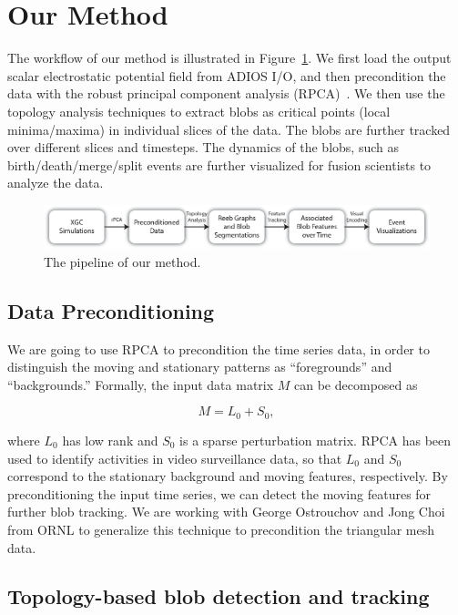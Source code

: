 \section{Our Method}
\label{sec:method}

The workflow of our method is illustrated in Figure~\ref{fig:pipeline}.  
We first load the output scalar electrostatic potential field from ADIOS I/O, and then precondition the data with the robust principal component analysis (RPCA)~\cite{CandesLMW11}.  We then use the topology analysis techniques to extract blobs as critical points (local minima/maxima) in individual slices of the data.  The blobs are further tracked over different slices and timesteps.  The dynamics of the blobs, such as birth/death/merge/split events are further visualized for fusion scientists to analyze the data.  

\begin{figure}[!h]
  \centering
  \includegraphics[width=\linewidth]{Figs/pipeline}
  \caption{The pipeline of our method.}
  \label{fig:pipeline}
\end{figure}


\subsection{Data Preconditioning}
We are going to use RPCA to precondition the time series data, in order to distinguish the moving and stationary patterns as ``foregrounds'' and ``backgrounds.''  Formally, the input data matrix $M$ can be decomposed as 

\begin{equation}
M = L_0 + S_0, 
\end{equation}

\noindent where $L_0$ has low rank and $S_0$ is a sparse perturbation matrix.  RPCA has been used to identify activities in video surveillance data, so that $L_0$ and $S_0$ correspond to the stationary background and moving features, respectively.  By preconditioning the input time series, we can detect the moving features for further blob tracking.  We are working with George Ostrouchov and Jong Choi from ORNL to generalize this technique to precondition the triangular mesh data.  


\subsection{Topology-based blob detection and tracking}

